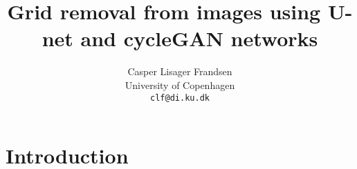 \documentclass{article}
\title{Grid removal from images using U-net and cycleGAN networks}
\author{Casper Lisager Frandsen\\
  University of Copenhagen\\
  \texttt{clf@di.ku.dk}
}
\begin{document}
\maketitle




\section{Introduction}





\end{document}
